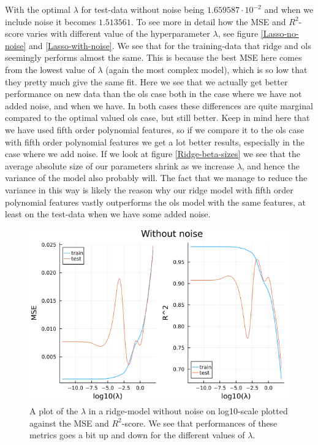 \documentclass{article}
\begin{document}
With the optimal $\lambda$ for test-data without noise being $1.659587\cdot
    10^{-2}$ and when we include noise it becomes $1.513561$.
To see more in detail how the MSE and $R^2$-score varies with different value of
the hyperparameter $\lambda$, see figure \ref{Lasso-no-noise} and
\ref{Lasso-with-noise}. We see that for the training-data that ridge and ols
seemingly performs almost the same.  This is because the best MSE here comes from the
lowest value of $\lambda$ (again the most complex model), which is so low that
they pretty much give the same fit. Here we see that we actually get better
performance on new data than the ols case both in the case where we have not
added noise, and when we have. In both cases these differences are quite
marginal compared to the optimal valued ols case, but still better. Keep in mind
here that we have used fifth order polynomial features, so if we compare it to
the ols case with fifth order polynomial features we get a lot better results,
especially in the case where we add noise. If we look at figure
\ref{Ridge-beta-sizes} we see that the average absolute size of our parameters
shrink as we increase $\lambda$, and hence the variance of the model also
probably will.  The fact that we manage to reduce the variance in this way is
likely the reason why our ridge model with fifth order polynomial features
vastly outperforms the ols model with the same features, at least on the
test-data when we have some added noise.
\begin{figure}
    \centerline{\includegraphics[scale=0.5]{ridge_without_noise}}
    \caption{A plot of the $\lambda$ in a ridge-model without noise on log10-scale plotted against the MSE and $R^2$-score. We see that performances of these metrics goes a bit up and down for the different values of $\lambda$.}
    \label{Ridge-with-noise}
\end{figure}
\end{document}
